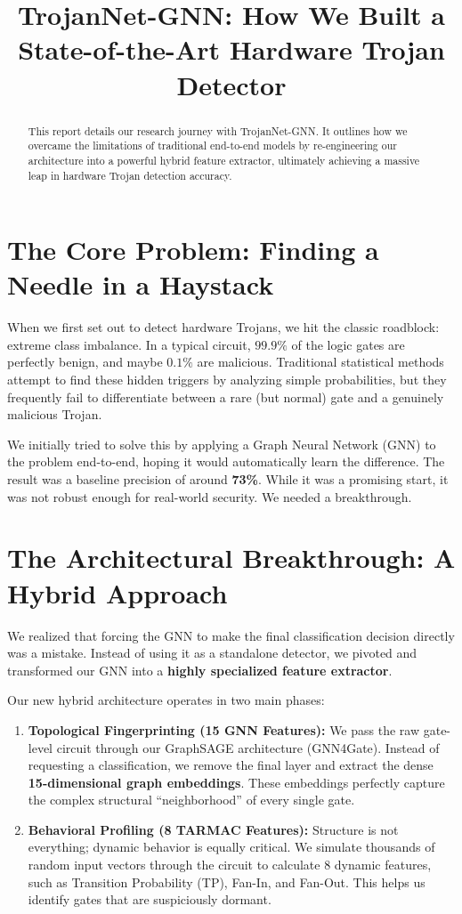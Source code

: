 \documentclass[12pt]{article}
\title{\textbf{TrojanNet-GNN: How We Built a State-of-the-Art Hardware Trojan Detector}}
\author{}
\date{}
\begin{document}
\maketitle

\begin{abstract}
This report details our research journey with TrojanNet-GNN. It outlines how we overcame the limitations of traditional end-to-end models by re-engineering our architecture into a powerful hybrid feature extractor, ultimately achieving a massive leap in hardware Trojan detection accuracy.
\end{abstract}

\section{The Core Problem: Finding a Needle in a Haystack}
When we first set out to detect hardware Trojans, we hit the classic roadblock: extreme class imbalance. In a typical circuit, $99.9\%$ of the logic gates are perfectly benign, and maybe $0.1\%$ are malicious. Traditional statistical methods attempt to find these hidden triggers by analyzing simple probabilities, but they frequently fail to differentiate between a rare (but normal) gate and a genuinely malicious Trojan.

We initially tried to solve this by applying a Graph Neural Network (GNN) to the problem end-to-end, hoping it would automatically learn the difference. The result was a baseline precision of around \textbf{73\%}. While it was a promising start, it was not robust enough for real-world security. We needed a breakthrough.

\section{The Architectural Breakthrough: A Hybrid Approach}
We realized that forcing the GNN to make the final classification decision directly was a mistake. Instead of using it as a standalone detector, we pivoted and transformed our GNN into a \textbf{highly specialized feature extractor}. 

Our new hybrid architecture operates in two main phases:

\begin{enumerate}
    \item \textbf{Topological Fingerprinting (15 GNN Features):} We pass the raw gate-level circuit through our GraphSAGE architecture (GNN4Gate). Instead of requesting a classification, we remove the final layer and extract the dense \textbf{15-dimensional graph embeddings}. These embeddings perfectly capture the complex structural ``neighborhood'' of every single gate.
    
    \item \textbf{Behavioral Profiling (8 TARMAC Features):} Structure is not everything; dynamic behavior is equally critical. We simulate thousands of random input vectors through the circuit to calculate 8 dynamic features, such as Transition Probability (TP), Fan-In, and Fan-Out. This helps us identify gates that are suspiciously dormant.
\end{enumerate}
\end{document}
